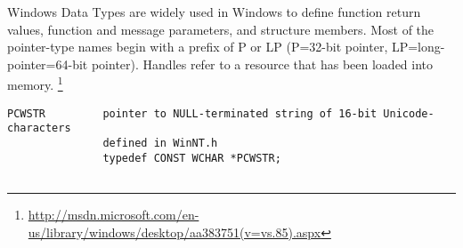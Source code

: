 Windows Data Types are widely used in Windows to define function return values,
function and message parameters, and structure members. Most of the pointer-type
names begin with a prefix of P or LP (P=32-bit pointer, LP=long-pointer=64-bit
pointer). Handles refer to a resource that has been loaded into memory.
\footnote{\url{http://msdn.microsoft.com/en-us/library/windows/desktop/aa383751(v=vs.85).aspx}}


\begin{Verbatim}
PCWSTR         pointer to NULL-terminated string of 16-bit Unicode-characters
               defined in WinNT.h  
               typedef CONST WCHAR *PCWSTR;
               
\end{Verbatim}
